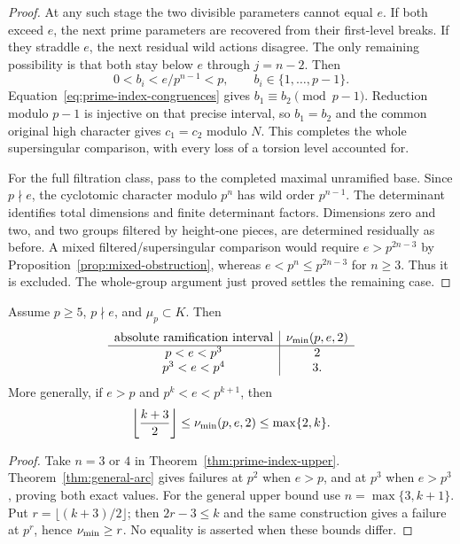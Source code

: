 \begin{proof}
At any such stage the two divisible parameters cannot equal $e$. If both exceed $e$, the next prime parameters are recovered from their first-level breaks. If they straddle $e$, the next residual wild actions disagree. The only remaining possibility is that both stay below $e$ through $j=n-2$. Then
\[
                 0<b_i<e/p^{n-1}<p,
                 \qquad b_i\in\{1,\ldots,p-1\}.
\]
Equation~\eqref{eq:prime-index-congruences} gives $b_1\equiv b_2\pmod{p-1}$. Reduction modulo $p-1$ is injective on that precise interval, so $b_1=b_2$ and the common original high character gives $c_1=c_2$ modulo $N$. This completes the whole supersingular comparison, with every loss of a torsion level accounted for.

For the full filtration class, pass to the completed maximal unramified base. Since $p\nmid e$, the cyclotomic character modulo $p^n$ has wild order $p^{n-1}$. The determinant identifies total dimensions and finite determinant factors. Dimensions zero and two, and two groups filtered by height-one pieces, are determined residually as before. A mixed filtered/supersingular comparison would require $e>p^{2n-3}$ by Proposition~\ref{prop:mixed-obstruction}, whereas $e<p^n\le p^{2n-3}$ for $n\ge3$. Thus it is excluded. The whole-group argument just proved settles the remaining case.
\end{proof}

\begin{corollary}\label{cor:prime-index-intervals}
Assume $p\ge5$, $p\nmid e$, and $\mu_p\subset K$. Then
\[
\begin{array}{c|c}
\text{absolute ramification interval}&\nu_{\min}(p,e,2)\\\hline
 p<e<p^3&2\\
 p^3<e<p^4&3.
\end{array}
\]
More generally, if $e>p$ and $p^k<e<p^{k+1}$, then
\[
 \left\lfloor\frac{k+3}{2}\right\rfloor
       \le\nu_{\min}(p,e,2)\le\max\{2,k\}.
\]
\end{corollary}
\begin{proof}
Take $n=3$ or $4$ in Theorem~\ref{thm:prime-index-upper}. Theorem~\ref{thm:general-arc} gives failures at $p^2$ when $e>p$, and at $p^3$ when $e>p^3$, proving both exact values. For the general upper bound use $n=\max\{3,k+1\}$. Put $r=\lfloor(k+3)/2\rfloor$; then $2r-3\le k$ and the same construction gives a failure at $p^r$, hence $\nu_{\min}\ge r$. No equality is asserted when these bounds differ.
\end{proof}
